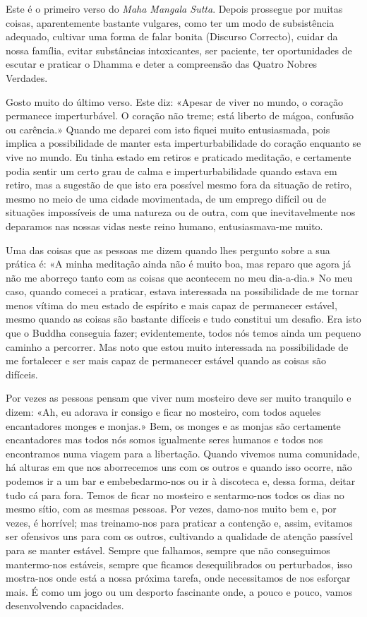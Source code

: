 Este é o primeiro verso do \emph{Maha Mangala Sutta}. Depois prossegue
por muitas coisas, aparentemente bastante vulgares, como ter um modo de
subsistência adequado, cultivar uma forma de falar bonita (Discurso
Correcto), cuidar da nossa família, evitar substâncias intoxicantes, ser
paciente, ter oportunidades de escutar e praticar o Dhamma e deter a
compreensão das Quatro Nobres Verdades.

Gosto muito do último verso. Este diz: «Apesar de viver no mundo, o
coração permanece imperturbável. O coração não treme; está liberto de
mágoa, confusão ou carência.» Quando me deparei com isto fiquei muito
entusiasmada, pois implica a possibilidade de manter esta
imperturbabilidade do coração enquanto se vive no mundo. Eu tinha estado
em retiros e praticado meditação, e certamente podia sentir um certo
grau de calma e imperturbabilidade quando estava em retiro, mas a
sugestão de que isto era possível mesmo fora da situação de retiro,
mesmo no meio de uma cidade movimentada, de um emprego difícil ou de
situações impossíveis de uma natureza ou de outra, com que
inevitavelmente nos deparamos nas nossas vidas neste reino humano,
entusiasmava-me muito.

Uma das coisas que as pessoas me dizem quando lhes pergunto sobre a sua
prática é: «A minha meditação ainda não é muito boa, mas reparo que
agora já não me aborreço tanto com as coisas que acontecem no meu
dia-a-dia.» No meu caso, quando comecei a praticar, estava interessada
na possibilidade de me tornar menos vítima do meu estado de espírito e
mais capaz de permanecer estável, mesmo quando as coisas são bastante
difíceis e tudo constitui um desafio. Era isto que o Buddha conseguia
fazer; evidentemente, todos nós temos ainda um pequeno caminho a
percorrer. Mas noto que estou muito interessada na possibilidade de me
fortalecer e ser mais capaz de permanecer estável quando as coisas são
difíceis.

Por vezes as pessoas pensam que viver num mosteiro deve ser muito
tranquilo e dizem: «Ah, eu adorava ir consigo e ficar no mosteiro, com
todos aqueles encantadores monges e monjas.» Bem, os monges e as monjas
são certamente encantadores mas todos nós somos igualmente seres humanos
e todos nos encontramos numa viagem para a libertação. Quando vivemos
numa comunidade, há alturas em que nos aborrecemos uns com os outros e
quando isso ocorre, não podemos ir a um bar e embebedarmo-nos ou ir à
discoteca e, dessa forma, deitar tudo cá para fora. Temos de ficar no
mosteiro e sentarmo-nos todos os dias no mesmo sítio, com as mesmas
pessoas. Por vezes, damo-nos muito bem e, por vezes, é horrível; mas
treinamo-nos para praticar a contenção e, assim, evitamos ser ofensivos
uns para com os outros, cultivando a qualidade de atenção passível para
se manter estável. Sempre que falhamos, sempre que não conseguimos
mantermo-nos estáveis, sempre que ficamos desequilibrados ou
perturbados, isso mostra-nos onde está a nossa próxima tarefa, onde
necessitamos de nos esforçar mais. É como um jogo ou um desporto
fascinante onde, a pouco e pouco, vamos desenvolvendo capacidades.

